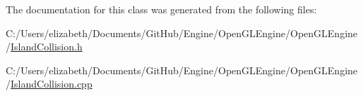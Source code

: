 The documentation for this class was generated from the following files\+:\begin{DoxyCompactItemize}
\item 
C\+:/\+Users/elizabeth/\+Documents/\+Git\+Hub/\+Engine/\+Open\+G\+L\+Engine/\+Open\+G\+L\+Engine/\hyperlink{_island_collision_8h}{Island\+Collision.\+h}\item 
C\+:/\+Users/elizabeth/\+Documents/\+Git\+Hub/\+Engine/\+Open\+G\+L\+Engine/\+Open\+G\+L\+Engine/\hyperlink{_island_collision_8cpp}{Island\+Collision.\+cpp}\end{DoxyCompactItemize}
